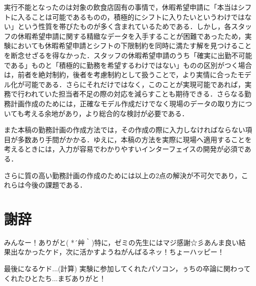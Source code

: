 \documentclass[twocolumn]{jsarticle}
\begin{document}
実行不能となったのは対象の飲食店固有の事情で，休暇希望申請に「本当はシフトに入ることは可能であるものの，積極的にシフトに入りたいというわけではない」という性質を帯びたものが多く含まれているためである．しかし，各スタッフの休暇希望申請に関する精緻なデータを入手することが困難であったため，実験においても休暇希望申請とシフトの下限制約を同時に満たす解を見つけることを断念せざるを得なかった．スタッフの休暇希望申請のうち「確実に出勤不可能である」ものと「積極的に勤務を希望するわけではない」ものの区別がつく場合は，前者を絶対制約，後者を考慮制約として扱うことで，より実情に合ったモデル化が可能である．さらにそれだけではなく，このことが実現可能であれば，実務で行われていた担当者不足の際の対応を減らすことも期待できる．さらなる勤務計画作成のためには，正確なモデル作成だけでなく現場のデータの取り方についても考える余地があり，より総合的な検討が必要である．

また本稿の勤務計画の作成方法では，その作成の際に入力しなければならない項目が多数あり手間がかかる．ゆえに，本稿の方法を実際に現場へ適用することを考えるときには，入力が容易でわかりやすいインターフェイスの開発が必須である．

さらに質の高い勤務計画の作成のためには以上の2点の解決が不可欠であり，これらは今後の課題である．

\section*{謝辞}
みんなー！ありがと( *´艸｀)特に，ゼミの先生にはマジ感謝☆彡あんま良い結果出なかったケド，次に活かすようねがんばるネッ！ちょーハッピー！

最後になるケド...(計算) 実験に参加してくれたパソコン，ぅちの卒論に関わってくれたひとたち...まぢありがと！
\end{document}
